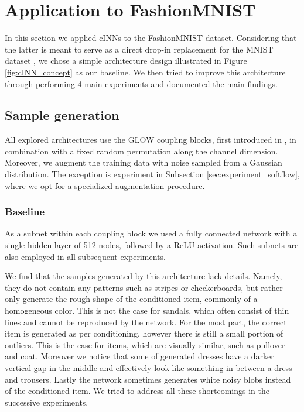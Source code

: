 \documentclass[final]{cvpr}
\begin{document}
\section{Application to FashionMNIST}
In this section we applied cINNs to the FashionMNIST dataset. Considering that the latter is meant to serve as a direct drop-in replacement for the MNIST dataset \cite{fashion_mnist}, we chose a simple architecture design illustrated in Figure \ref{fig:cINN_concept} as our baseline. We then tried to improve this architecture through performing 4 main experiments and documented the main findings. 

\subsection{Sample generation}
All explored architectures use the GLOW coupling blocks, first introduced in \cite{GLOW}, in combination with a fixed random permutation along the channel dimension. Moreover, we augment the training data with noise sampled from a Gaussian distribution.  The exception is experiment in Subsection \ref{sec:experiment_softflow}, where we opt for a specialized augmentation procedure.

\subsubsection{Baseline}
As a subnet within each coupling block we used a fully connected network with a single hidden layer of 512 nodes, followed by a ReLU activation. Such subnets are also employed in all subsequent experiments.

We find that the samples generated by this architecture lack details. Namely, they do not contain any patterns such as stripes or checkerboards, but rather only generate the rough shape of the conditioned item, commonly of a homogeneous color. This is not the case for sandals, which often consist of thin lines and cannot be reproduced by the network. For the most part, the correct item is generated as per conditioning, however there is still a small portion of outliers. This is the case for items, which are visually similar, such as pullover and coat. Moreover we notice that some of generated dresses have a darker vertical gap in the middle and effectively look like something in between a dress and trousers. Lastly the network sometimes generates white noisy blobs instead of the conditioned item. We tried to address all these shortcomings in the successive experiments.
\end{document}
